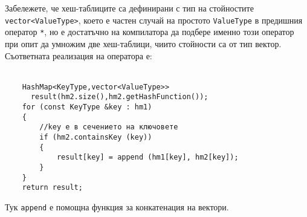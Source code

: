 \documentclass[12pt,a4paper]{article}
\begin{document}
\begin{enumerate}
\begin{mdframed}[hidealllines=true,backgroundcolor=gray!20]
		Забележете, че хеш-таблиците са дефинирани с тип на стойностите \texttt{vector<ValueType>}, което е частен случай на простото \texttt{ValueType} в предишния оператор \texttt{*}, но е достатъчно на компилатора да подбере именно този оператор при опит да умножим две хеш-таблици, чиито стойности са от тип вектор. Съответната реализация на оператора е:
		\\
		\\

	\begin{verbatim}
	HashMap<KeyType,vector<ValueType>>
	  result(hm2.size(),hm2.getHashFunction());
	for (const KeyType &key : hm1)
	{
	    //key е в сечението на ключовете
	    if (hm2.containsKey (key))
	    {
	        result[key] = append (hm1[key], hm2[key]);
	    }
	}
	return result;

	\end{verbatim}

	    Тук \texttt{append} е помощна функция за конкатенация на вектори.




		\end{mdframed}




	\end{enumerate}
\end{document}
